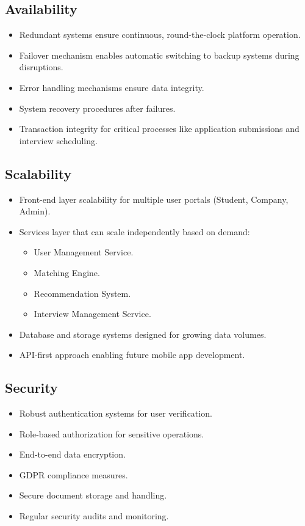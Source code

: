 \subsection{Availability}
\label{subsec:availability}
\begin{itemize}
    \item Redundant systems ensure continuous, round-the-clock platform operation.
    \item Failover mechanism enables automatic switching to backup systems during disruptions.
    \item Error handling mechanisms ensure data integrity.
    \item System recovery procedures after failures.
    \item Transaction integrity for critical processes like application submissions and interview scheduling.
\end{itemize}

\subsection{Scalability}
\label{subsec:scalability}
\begin{itemize}
    \item Front-end layer scalability for multiple user portals (Student, Company, Admin).
    \item Services layer that can scale independently based on demand:
    \begin{itemize}
        \item User Management Service.
        \item Matching Engine.
        \item Recommendation System.
        \item Interview Management Service.
    \end{itemize}
    \item Database and storage systems designed for growing data volumes.
    \item API-first approach enabling future mobile app development.
\end{itemize}

\subsection{Security}
\label{subsec:security}
\begin{itemize}
    \item Robust authentication systems for user verification.
    \item Role-based authorization for sensitive operations.
    \item End-to-end data encryption.
    \item GDPR compliance measures.
    \item Secure document storage and handling.
    \item Regular security audits and monitoring.
\end{itemize}

